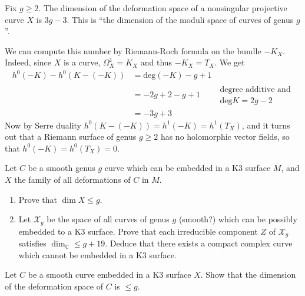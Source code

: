 \documentclass{book}
\begin{document}
\begin{example}
\label{example-modul-space-nonsi-riema}
\begin{reference}
\cite[Example 3.1]{continued-fractions}
\end{reference}
Fix $g \geq 2$. The dimension of the
deformation space of a nonsingular
projective curve $X$ is $3g-3$. This is ``the
dimension of the moduli space of
curves of genus $g$''.

We can compute this number by Riemann-Roch
formula on the bundle $-K_X$.
Indeed, since $X$ is a curve,
$\Omega_X^1=K_X$ and thus $-K_X=T_X$. We get
$$
\begin{aligned}
h^0(-K)-h^0(K-(-K))&=\text{deg}(-K)-g+1\\
&=-2g+2-g+1\qquad \substack{\text{degree
additive and}\\ \text{deg}K=2g-2}\\
&=-3g+3
\end{aligned}
$$
Now by Serre duality
$h^0(K-(-K))=h^1(-K)=h^1(T_X)$, and it turns
out that a
Riemann surface of genus $g \geq 2$ has no
holomorphic vector fields, so that
$h^0(-K)=h^0(T_X)=0$.
\end{example}

\begin{exercise}
\label{exercise-deformations-of-curves-in-K3}
Let $C$ be a smooth genus $g$ curve which can
be embedded in a K3 surface  $M$,
and $X$ the family of all deformations of $C$
in $M$.
\begin{enumerate}
\item Prove that $\dim X \leq  g$.
\item Let $\mathcal{X}_g$ be the space of all
curves of genus $g$ (smooth?)
which can be possibly embedded to a K3
surface. Prove that each irreducible
component $Z$ of $\mathcal{X}_g$ satisfies
$\dim_\mathbb{C} \leq  g+19$. Deduce
that there exists a compact complex curve
which cannot be embedded in a K3
surface.
\end{enumerate}
\end{exercise}

\begin{exercise}
\label{exercise-}
Let $C$ be a smooth curve embedded in a K3
surface $X$. Show that the dimension
of the deformation space of $C$ is $\leq g$.
\end{exercise}
\end{document}
